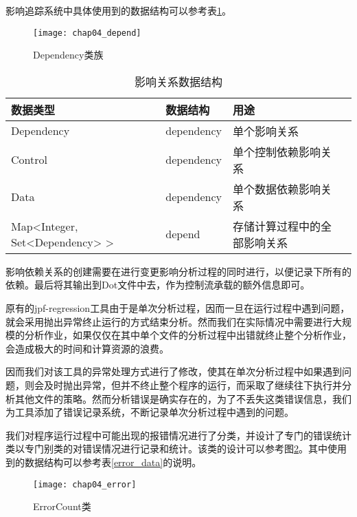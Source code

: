 影响追踪系统中具体使用到的数据结构可以参考表\ref {track_data}。

\begin{figure}[H]
	\centering
	\texttt{[image: chap04\_depend]}
	\caption {Dependency类族}
	\label {class_depend}	
\end{figure}

\begin{table}
	\caption{影响关系数据结构}
	\label{track_data}
	\centering
	\begin{tabular}{lllc}
		\toprule[1.5pt]
		{\heiti 数据类型} &{\heiti 数据结构} & {\heiti 用途} \\\midrule[1pt]
		Dependency & dependency & 单个影响关系 \\
		Control & dependency & 单个控制依赖影响关系 \\
		Data & dependency & 单个数据依赖影响关系 \\
		Map<Integer, Set<Dependency> > & depend & 存储计算过程中的全部影响关系\\
		\bottomrule[1.5pt]
	\end{tabular}
\end{table}

影响依赖关系的创建需要在进行变更影响分析过程的同时进行，以便记录下所有的依赖。最后将其输出到Dot文件中去，作为控制流承载的额外信息即可。

原有的jpf-regression工具由于是单次分析过程，因而一旦在运行过程中遇到问题，就会采用抛出异常终止运行的方式结束分析。然而我们在实际情况中需要进行大规模的分析作业，如果仅仅在其中单个文件的分析过程中出错就终止整个分析作业，会造成极大的时间和计算资源的浪费。

因而我们对该工具的异常处理方式进行了修改，使其在单次分析过程中如果遇到问题，则会及时抛出异常，但并不终止整个程序的运行，而采取了继续往下执行并分析其他文件的策略。然而分析错误是确实存在的，为了不丢失这类错误信息，我们为工具添加了错误记录系统，不断记录单次分析过程中遇到的问题。

我们对程序运行过程中可能出现的报错情况进行了分类，并设计了专门的错误统计类以专门别类的对错误情况进行记录和统计。该类的设计可以参考图\ref {class_error}。其中使用到的数据结构可以参考表\ref {error_data}的说明。

\begin{figure}[H]
	\centering
	\texttt{[image: chap04\_error]}
	\caption {ErrorCount类}
	\label {class_error}	
\end{figure}

